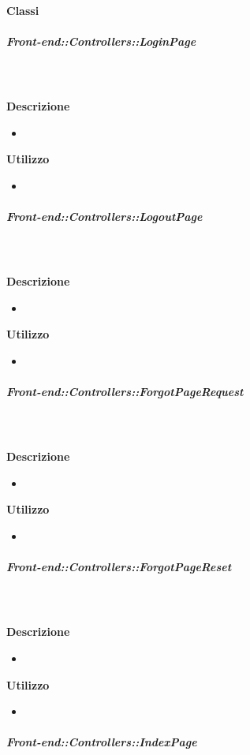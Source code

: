     \paragraph{Classi}
      \subparagraph{Front-end::Controllers::LoginPage}
        
        \textbf{\\ \\ Descrizione} 
          \begin{itemize}
            \item[] 
          \end{itemize}      
        \textbf{Utilizzo}  
          \begin{itemize}
            \item[] 
          \end{itemize}
      \subparagraph{Front-end::Controllers::LogoutPage}
        
        \textbf{\\ \\ Descrizione} 
          \begin{itemize}
            \item[] 
          \end{itemize}      
        \textbf{Utilizzo}  
          \begin{itemize}
            \item[] 
          \end{itemize}
      \subparagraph{Front-end::Controllers::ForgotPageRequest}
        
        \textbf{\\ \\ Descrizione} 
          \begin{itemize}
            \item[] 
          \end{itemize}      
        \textbf{Utilizzo}  
          \begin{itemize}
            \item[] 
          \end{itemize}
      \subparagraph{Front-end::Controllers::ForgotPageReset}
        
        \textbf{\\ \\ Descrizione} 
          \begin{itemize}
            \item[] 
          \end{itemize}      
        \textbf{Utilizzo}  
          \begin{itemize}
            \item[] 
          \end{itemize}
      \subparagraph{Front-end::Controllers::IndexPage}
        
